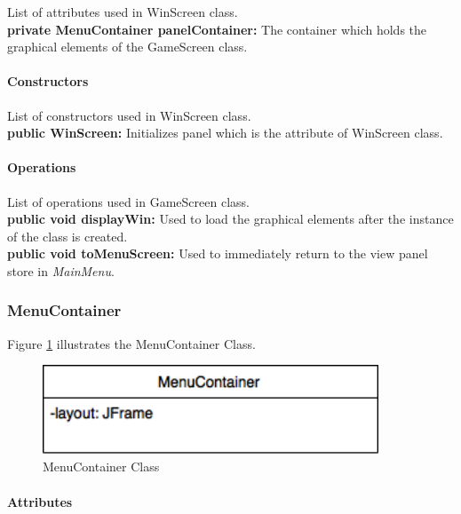 \documentclass[12pt]{article} %
\begin{document}
List of attributes used in WinScreen class.\\
\textbf{private MenuContainer panelContainer:} The container which holds the graphical elements of the GameScreen class. 

\paragraph{Constructors \\}
List of constructors used in WinScreen class.\\
\textbf{public WinScreen:} Initializes panel which is the attribute of WinScreen class.

\paragraph{Operations \\}
List of operations used in GameScreen class.\\
\textbf{public void displayWin:} Used to load the graphical elements after the instance of the class is created.\\
\textbf{public void toMenuScreen:} Used to immediately return to the view panel store in \textit{MainMenu}. \\



\subsubsection{MenuContainer} %

Figure \ref{fig:menucontainer} illustrates the MenuContainer Class.
\begin{figure}[h!]
   \centering
   \vspace{10pt}%
   \includegraphics[width=10cm]{menucontainer.png}
   \caption{MenuContainer Class}
   \label{fig:menucontainer}
\end{figure}

\paragraph{Attributes \\}
\end{document}
